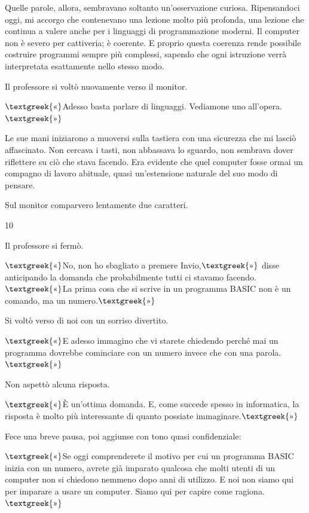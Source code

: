 \documentclass{article}
\begin{document}
Quelle parole, allora, sembravano soltanto un'osservazione curiosa. Ripensandoci oggi, mi accorgo che contenevano una
lezione molto più profonda, una lezione che continua a valere anche per i linguaggi di programmazione moderni. Il
computer non è severo per cattiveria; è coerente. E proprio questa coerenza rende possibile costruire programmi sempre
più complessi, sapendo che ogni istruzione verrà interpretata esattamente nello stesso modo.

Il professore si voltò nuovamente verso il monitor.

$\text{\textgreek{«}}$Adesso basta parlare di linguaggi. Vediamone uno all'opera.$\text{\textgreek{»}}$

Le sue mani iniziarono a muoversi sulla tastiera con una sicurezza che mi lasciò affascinato. Non cercava i tasti, non
abbassava lo sguardo, non sembrava dover riflettere su ciò che stava facendo. Era evidente che quel computer fosse
ormai un compagno di lavoro abituale, quasi un'estensione naturale del suo modo di pensare.

Sul monitor comparvero lentamente due caratteri.

10

Il professore si fermò.

$\text{\textgreek{«}}$No, non ho sbagliato a premere Invio,$\text{\textgreek{»}}$ disse anticipando la domanda che
probabilmente tutti ci stavamo facendo. $\text{\textgreek{«}}$La prima cosa che si scrive in un programma BASIC non è
un comando, ma un numero.$\text{\textgreek{»}}$

Si voltò verso di noi con un sorriso divertito.

$\text{\textgreek{«}}$E adesso immagino che vi starete chiedendo perché mai un programma dovrebbe cominciare con un
numero invece che con una parola.$\text{\textgreek{»}}$

Non aspettò alcuna risposta.

$\text{\textgreek{«}}$È un'ottima domanda. E, come succede spesso in informatica, la risposta è molto più interessante
di quanto possiate immaginare.$\text{\textgreek{»}}$

Fece una breve pausa, poi aggiunse con tono quasi confidenziale:

$\text{\textgreek{«}}$Se oggi comprenderete il motivo per cui un programma BASIC inizia con un numero, avrete già
imparato qualcosa che molti utenti di un computer non si chiedono nemmeno dopo anni di utilizzo. E noi non siamo qui
per imparare a usare un computer. Siamo qui per capire come ragiona.$\text{\textgreek{»}}$
\end{document}
